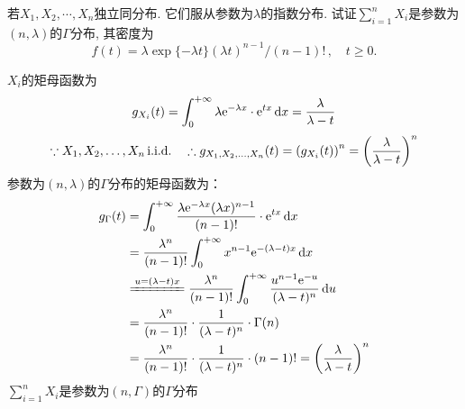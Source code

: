 \begin{problem}{1.13}
若$X_1, X_2,\cdots, X_n$独立同分布. 它们服从参数为$\lambda$的指数分布. 试证$\sum\limits^n_{i=1}X_i$是参数为$(n, \lambda)$的$\Gamma$分布, 其密度为
\[f(t) = \lambda \exp\{-\lambda t\}(\lambda t)^{n-1}/(n-1)!\, ,\quad t \geqslant 0.\]
\end{problem}
\begin{solution}
	$X_i$的矩母函数为\[g_{X_i}(t)=\int_{0}^{+\infty}\lambda \mathrm{e}^{-\lambda x}\cdot \mathrm{e}^{tx}\mathop{}\!\mathrm{d} x = \frac{\lambda}{\lambda -t}\]
	\[\because X_1,X_2,\dots ,X_n \mathop{}\!\mathrm{i.i.d.} \quad \therefore g_{X_1,X_2,\dots ,X_n}(t) = \left(g_{X_i}(t)\right)^n = \left(\frac{\lambda}{\lambda - t}\right)^n\]
	参数为$(n, \lambda )$的$\Gamma $分布的矩母函数为：
	\[\begin{aligned}
			g_{\Gamma }(t) & = \int_{0}^{+\infty}\frac{\lambda \e^{-\lambda x}(\lambda x)^{n-1}}{(n-1)!}\cdot \e^{tx}\d x                      \\
			               & = \frac{\lambda ^n}{(n-1)!}\int_{0}^{+\infty}x^{n-1}\e^{-(\lambda -t)x}\d x                                       \\
			               & \xlongequal{u=(\lambda -t)x} \frac{\lambda ^n}{(n-1)!}\int_{0}^{+\infty}\frac{u^{n-1}\e^{-u}}{(\lambda -t)^n}\d u \\
			               & = \frac{\lambda ^n}{(n-1)!}\cdot \frac{1}{(\lambda -t)^n}\cdot \Gamma(n)                                          \\
			               & = \frac{\lambda ^n}{(n-1)!}\cdot \frac{1}{(\lambda -t)^n}\cdot (n-1)! = \left(\frac{\lambda}{\lambda -t}\right)^n \\
		\end{aligned}\]
	$\sum_{i=1}^{n}X_i$是参数为$(n,\Gamma )$的$\Gamma $分布
\end{solution}

